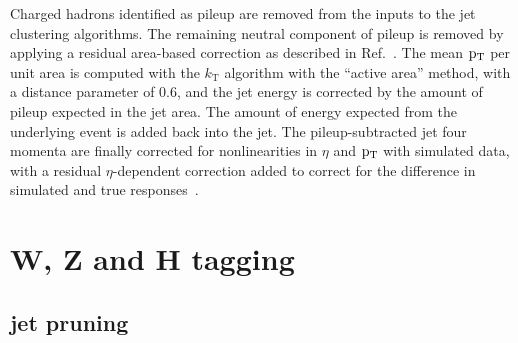 Charged hadrons identified as pileup are removed from the inputs to
the jet clustering algorithms.  The remaining neutral component of pileup
is removed by applying a residual area-based correction as
described in Ref.~\cite{jetarea_fastjet,jetarea_fastjet_pu}.  The mean
$\mathrm{p_{T}}$ per unit area is computed with the $k_{\mathrm T}$ algorithm
with the ``active area'' method, with a distance parameter of 0.6, and
the jet energy is corrected by the amount of pileup expected in the
jet area. The amount of energy expected from the underlying event is
added back into the jet.  The pileup-subtracted jet four momenta are
finally corrected for nonlinearities in $\eta$ and $\mathrm{p_{T}}$ with
simulated data, with a residual $\eta$-dependent correction added to
correct for the difference in simulated and true
responses~\cite{JME-JINST,Collaboration:2012dp}.

\section{W, Z and H tagging}

\subsection{jet pruning}


